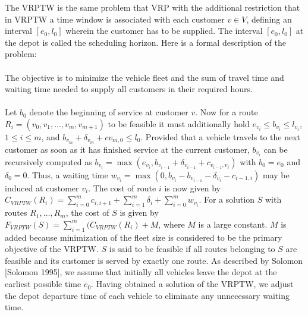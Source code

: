 \documentclass{article}
\begin{document}
The VRPTW is the same problem that VRP with the additional restriction that in VRPTW a time window is associated with each customer ${v \in V}$, defining an interval ${\left[ e_{0}, l_{0} \right]}$ wherein the customer has to be supplied. The interval ${\left[ e_{0}, l_{0} \right]}$ at the depot is called the scheduling horizon. Here is a formal description of the problem:\\ \ \\

The objective is to minimize the vehicle fleet and the sum of travel time and waiting time needed to supply all customers in their required hours. \\ \ \\

Let ${b_{0}}$ denote the beginning of service at customer ${v}$. Now for a route ${R_{i} = (v_{0}, v_{1}, …, v_{m}, v_{m+1})}$ to be feasible it must additionally hold ${e_{v_{i}} \leq b_{v_{i}} \leq l_{v_{i}}}$, ${1 \leq i \leq m}$, and ${b_{v_{m}} + \delta_{v_{m}} + c{v_{m,0}} \leq l_{0}}$. Provided that a vehicle travels to the next customer as soon as it has finished service at the current customer, ${b_{v_{i}}}$ can be recursively computed as ${b_{v_{i}} = \max{(e_{v_{i}},b_{v_{i-1}}+\delta_{v_{i-1}}+c_{v_{i-1},v_{i}})}}$ with ${b_{0} = e_{0}}$ and ${\delta_{0} = 0}$. Thus, a waiting time ${w_{v_{i}} = \max{(0,b_{v_{i}}-b_{v_{i-1}}-\delta_{v_{i}}-c_{i-1,i})}}$ may be induced at customer ${v_{i}}$. The cost of route ${i}$ is now given by \\ ${C_{VRPTW}(R_{i}) = \sum_{i=0}^{m} c_{i,i+1} + \sum_{i=1}^{m} \delta_{i} + \sum_{i=0}^{m} w_{v_{i}}}$. For a solution ${S}$ with routes ${R_{1}, …, R_{m}}$, the cost of ${S}$ is given by \\ ${F_{VRPTW}(S) = \sum_{i=1}^{m}(C_{VRPTW}(R_{i})+M}$, where ${M}$ is a large constant. ${M}$ is added because minimization of the fleet size is considered to be the primary objective of the VRPTW. ${S}$ is said to be feasible if all routes belonging to ${S}$ are feasible and its customer is served by exactly one route. As described by Solomon [Solomon 1995], we assume that initially all vehicles leave the depot at the earliest possible time ${e_{0}}$. Having obtained a solution of the VRPTW, we adjust the depot departure time of each vehicle to eliminate any unnecessary waiting time.
\end{document}
